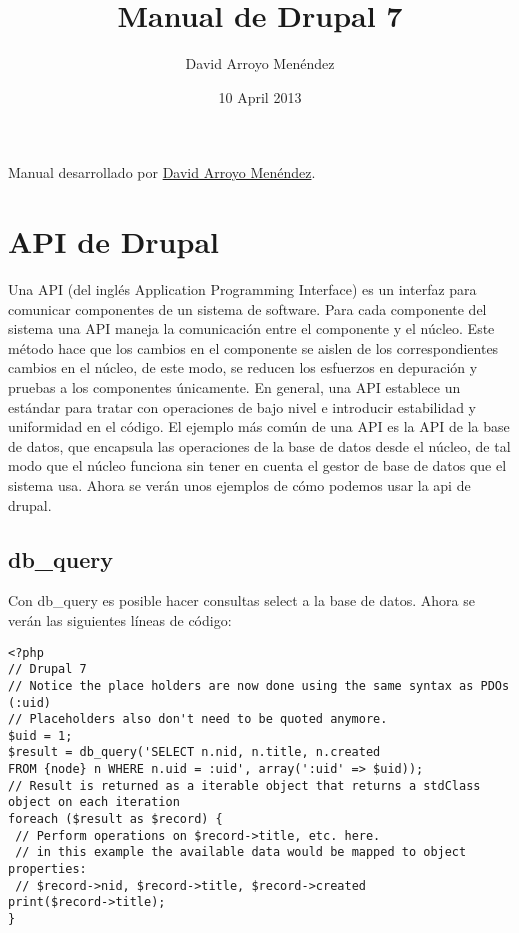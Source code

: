 \documentclass[11pt]{article}
\title{Manual de Drupal 7}
\author{David Arroyo Menéndez}
\date{10 April 2013}
\begin{document}
\maketitle

\setcounter{tocdepth}{3}
\tableofcontents
\vspace*{1cm}

Manual desarrollado por \href{http://www.davidam.com}{David Arroyo Menéndez}.  


\section{API de Drupal}
\label{sec-1}


Una API (del inglés Application Programming Interface) es un interfaz
para comunicar componentes de un sistema de software. Para cada
componente del sistema una API maneja la comunicación entre el
componente y el núcleo. Este método hace que los cambios en el
componente se aislen de los correspondientes cambios en el núcleo, de
este modo, se reducen los esfuerzos en depuración y pruebas a los
componentes únicamente.  En general, una API establece un estándar
para tratar con operaciones de bajo nivel e introducir estabilidad y
uniformidad en el código. El ejemplo más común de una API es la API de
la base de datos, que encapsula las operaciones de la base de datos
desde el núcleo, de tal modo que el núcleo funciona sin tener en
cuenta el gestor de base de datos que el sistema usa.  Ahora se verán
unos ejemplos de cómo podemos usar la api de drupal.

\subsection{db\_query}
\label{sec-1.1}


Con db\_query es posible hacer consultas select a la base de
datos. Ahora se verán las siguientes líneas de código:


\begin{verbatim}
<?php
// Drupal 7
// Notice the place holders are now done using the same syntax as PDOs (:uid)
// Placeholders also don't need to be quoted anymore.
$uid = 1;
$result = db_query('SELECT n.nid, n.title, n.created
FROM {node} n WHERE n.uid = :uid', array(':uid' => $uid));
// Result is returned as a iterable object that returns a stdClass object on each iteration
foreach ($result as $record) {
 // Perform operations on $record->title, etc. here.
 // in this example the available data would be mapped to object properties:
 // $record->nid, $record->title, $record->created
print($record->title);
}
\end{verbatim}
\end{document}
